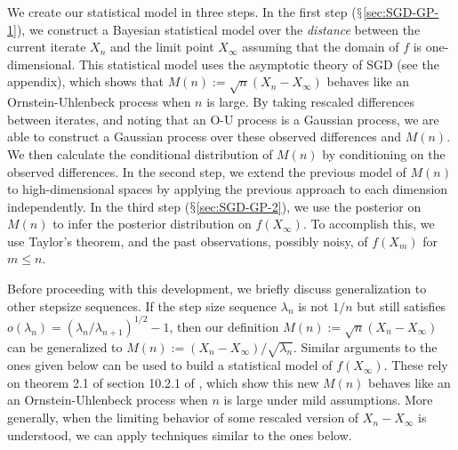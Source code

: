\documentclass[12pt,english]{article}
\newcommand{\pfcomment}[1]{{\color{red} PF: #1}}
\newcommand{\stedit}[1]{{\color{blue} #1}}
\begin{document}
We create our statistical model in three steps.  
In the first step ($\mathsection$\ref{sec:SGD-GP-1}),  we construct a Bayesian statistical model over the {\it distance} between the current iterate $X_n$ and the limit point $X_\infty$ \stedit{assuming that the domain of $f$ is one-dimensional}.  This statistical model uses the asymptotic theory of SGD (see the appendix), which shows that $M(n):=\sqrt{n}\left(X_{n}-X_{\infty}\right)$ behaves like an Ornstein-Uhlenbeck process when $n$ is large.
By  taking rescaled differences between iterates, and noting that an O-U process is a Gaussian process, we are able to construct a Gaussian process over these observed differences and $M(n)$. We then calculate the conditional distribution of $M(n)$ by conditioning on the observed differences. \stedit{In the second step, we extend the previous model of $M(n)$ to high-dimensional spaces by applying the previous approach to each dimension independently.} In the third step ($\mathsection$\ref{sec:SGD-GP-2}), we use the posterior on $M(n)$ to infer the posterior distribution on $f(X_\infty)$.  To accomplish this, we use \stedit{Taylor's theorem, and the past observations, possibly noisy, of $f(X_m)$ for $m \leq n$}.

Before proceeding with this development, we briefly discuss generalization to other stepsize sequences. If the step size sequence $\lambda_{n}$ is not $1/n$ but still satisfies $o(\lambda_{n}) = (\lambda_{n}/\lambda_{n+1})^{1/2}-1$, then our definition $M(n):=\sqrt{n}(X_{n}-X_{\infty})$ can be generalized to $M(n):=(X_{n}-X_{\infty})/ \sqrt{\lambda_{n}}$. Similar arguments to the ones given below can be used to build a statistical model of $f(X_\infty)$. These rely on theorem 2.1 of section 10.2.1 of \cite{kushner}, which show this new $M(n)$ behaves like an an Ornstein-Uhlenbeck process when $n$ is large under mild assumptions. More generally, when the limiting behavior of some rescaled version of $X_n - X_\infty$ is understood, we can apply techniques similar to the ones below.



\end{document}

